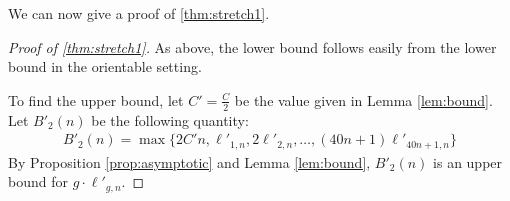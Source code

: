 We can now give a proof of \autoref{thm:stretch1}.

\begin{proof}[Proof of \autoref{thm:stretch1}]
As above, the lower bound follows easily from the lower bound in the orientable setting.  %

  To find the upper bound, let $C'=\frac{C}{2}$ be the value given in Lemma \ref{lem:bound}. Let $B'_2(n)$ be the
  following quantity:
  \begin{align*}
    B'_2(n) = \max\{2C'n, \ell'_{1,n}, 2\ell'_{2,n}, \dots, (40n + 1)\ell'_{40n+1,n}\}
  \end{align*}
  By Proposition \ref{prop:asymptotic} and Lemma \ref{lem:bound}, $B'_2(n)$ is an upper bound for $g\cdot \ell'_{g,n}$.
\end{proof}